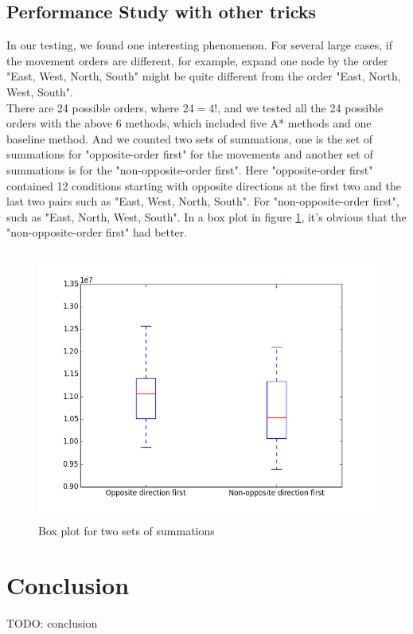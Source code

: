 \documentclass[11pt, letter]{article}
\begin{document}
\subsection{Performance Study with other tricks}
In our testing, we found one interesting phenomenon. For several large cases, if the movement orders are different, for example, expand one node by the order "East, West, North, South" might be quite different from the order "East, North, West, South". \\
There are 24 possible orders, where $24 = 4!$, and we tested all the 24 possible orders with the above 6 methods, which included five A* methods and one baseline method. And we counted two sets of summations, one is the set of summations for "opposite-order first" for the movements and another set of summations is for the "non-opposite-order first". Here "opposite-order first" contained 12 conditions starting with opposite directions at the first two and the last two pairs such as "East, West, North, South". For "non-opposite-order first", such as "East, North, West, South". In a box plot in figure \ref{fig_boxplot}, it's obvious that the "non-opposite-order first" had better.
\begin{figure} [h!]
\centering
\includegraphics[height=3.5in, width=4.5in]{figs/boxplot.png}
\caption{Box plot for two sets of summations}
\label{fig_boxplot}
\end{figure}

\section{Conclusion}

TODO: conclusion
\end{document}
